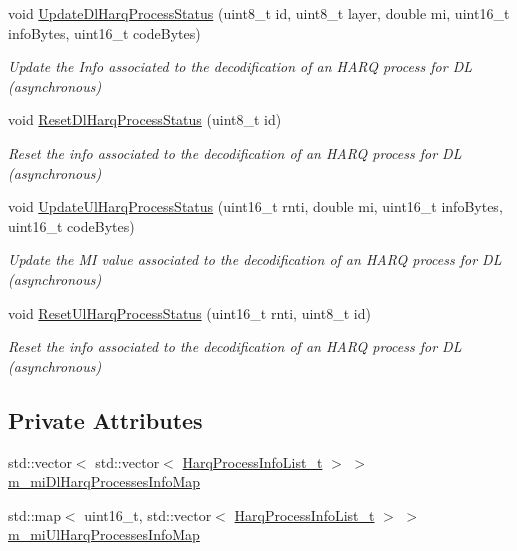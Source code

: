 \begin{DoxyCompactItemize}
void \hyperlink{classns3_1_1LteHarqPhy_a584fc02c54ceca0e5f20d8c89721e880}{Update\+Dl\+Harq\+Process\+Status} (uint8\+\_\+t id, uint8\+\_\+t layer, double mi, uint16\+\_\+t info\+Bytes, uint16\+\_\+t code\+Bytes)
\begin{DoxyCompactList}\small\item\em Update the Info associated to the decodification of an H\+A\+RQ process for DL (asynchronous) \end{DoxyCompactList}\item 
void \hyperlink{classns3_1_1LteHarqPhy_a932799412ea1a14ca0858b7531c66278}{Reset\+Dl\+Harq\+Process\+Status} (uint8\+\_\+t id)
\begin{DoxyCompactList}\small\item\em Reset the info associated to the decodification of an H\+A\+RQ process for DL (asynchronous) \end{DoxyCompactList}\item 
void \hyperlink{classns3_1_1LteHarqPhy_a5a46b077465cc65ab30ae127db3ed62b}{Update\+Ul\+Harq\+Process\+Status} (uint16\+\_\+t rnti, double mi, uint16\+\_\+t info\+Bytes, uint16\+\_\+t code\+Bytes)
\begin{DoxyCompactList}\small\item\em Update the MI value associated to the decodification of an H\+A\+RQ process for DL (asynchronous) \end{DoxyCompactList}\item 
void \hyperlink{classns3_1_1LteHarqPhy_ae121a39a57679076273aecbcd767f5f9}{Reset\+Ul\+Harq\+Process\+Status} (uint16\+\_\+t rnti, uint8\+\_\+t id)
\begin{DoxyCompactList}\small\item\em Reset the info associated to the decodification of an H\+A\+RQ process for DL (asynchronous) \end{DoxyCompactList}\end{DoxyCompactItemize}
\subsection*{Private Attributes}
\begin{DoxyCompactItemize}
\item 
std\+::vector$<$ std\+::vector$<$ \hyperlink{namespacens3_a8e9da9f7a4e5c0954a109b0e1dc36e40}{Harq\+Process\+Info\+List\+\_\+t} $>$ $>$ \hyperlink{classns3_1_1LteHarqPhy_a9c05c5106b4d55fbf62a1545ba8f9259}{m\+\_\+mi\+Dl\+Harq\+Processes\+Info\+Map}
\item 
std\+::map$<$ uint16\+\_\+t, std\+::vector$<$ \hyperlink{namespacens3_a8e9da9f7a4e5c0954a109b0e1dc36e40}{Harq\+Process\+Info\+List\+\_\+t} $>$ $>$ \hyperlink{classns3_1_1LteHarqPhy_a5c2076f55ee78d6e83434e34db799e67}{m\+\_\+mi\+Ul\+Harq\+Processes\+Info\+Map}
\end{DoxyCompactItemize}
